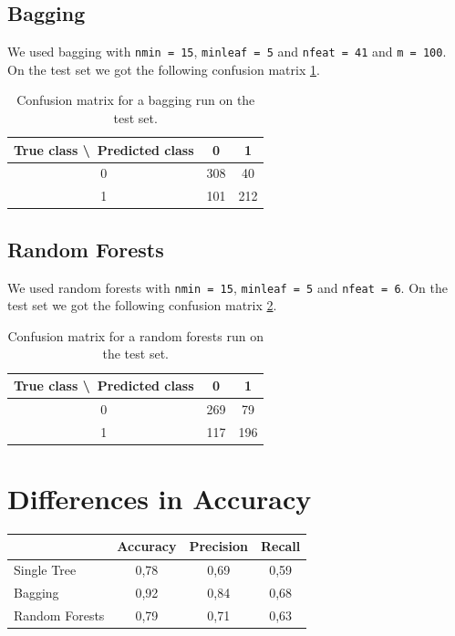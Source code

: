 \documentclass[a4paper,11pt]{article}
\begin{document}
\subsection{Bagging}
We used bagging with \verb|nmin = 15|, \verb|minleaf = 5| and \verb|nfeat = 41| and \verb|m = 100|. On the test set we got the following confusion matrix \ref{tab: bagging}.

\begin{table}[h!]
\centering
	\begin{tabular}{c||c|c}
	True class \textbackslash\ Predicted class & 0 & 1 \\ \hline \hline
	0 & 308 & 40 \\ \hline
	1 & 101 & 212
	\end{tabular}
	\caption{Confusion matrix for a bagging run on the test set.}
	\label{tab: bagging}
\end{table}



\subsection{Random Forests}
We used random forests with \verb|nmin = 15|, \verb|minleaf = 5| and  \verb|nfeat = 6|. On the test set we got the following confusion matrix \ref{tab: randomforest}.

\begin{table}[h!]
\centering
	\begin{tabular}{c||c|c}
	True class \textbackslash\ Predicted class & 0 & 1 \\ \hline \hline
	0 & 269 & 79 \\ \hline
	1 & 117 & 196
	\end{tabular}
	\caption{Confusion matrix for a random forests run on the test set.}
	\label{tab: randomforest}
\end{table}



\section{Differences in Accuracy}

\begin{table}[h!]
\centering
	\begin{tabular}{l||c|c|c}
	& Accuracy & Precision & Recall \\ \hline \hline
	Single Tree & 0{,}78 & 0{,}69 & 0{,}59 \\ \hline
	Bagging & 0{,}92 & 0{,}84 & 0{,}68 \\ \hline
	Random Forests & 0{,}79 & 0{,}71 & 0{,}63  
	\end{tabular}
\end{table}



\end{document}

